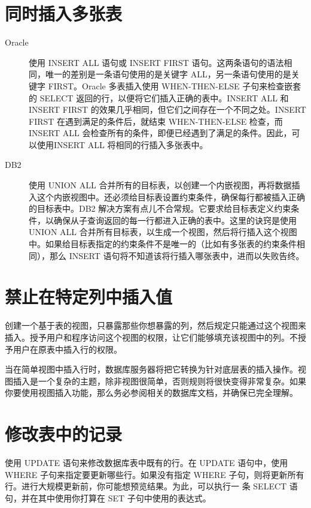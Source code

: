 \section{同时插入多张表}
\begin{description}
    \item[Oracle] 使用 INSERT ALL 语句或 INSERT FIRST 语句。这两条语句的语法相同，唯一的差别是一条语句使用的是关键字 ALL，另一条语句使用的是关键字 FIRST。Oracle 多表插入使用 WHEN-THEN-ELSE 子句来检查嵌套的 SELECT 返回的行，以便将它们插入正确的表中。INSERT ALL 和 INSERT FIRST 的效果几乎相同，但它们之间存在一个不同之处。INSERT FIRST 在遇到满足的条件后，就结束 WHEN-THEN-ELSE 检查，而 INSERT ALL 会检查所有的条件，即便已经遇到了满足的条件。因此，可以使用INSERT ALL 将相同的行插入多张表中。
    \item[DB2] 使用 UNION ALL 合并所有的目标表，以创建一个内嵌视图，再将数据插入这个内嵌视图中。还必须给目标表设置约束条件，确保每行都被插入正确的目标表中。DB2 解决方案有点儿不合常规。它要求给目标表定义约束条件，以确保从子查询返回的每一行都进入正确的表中。这里的诀窍是使用 UNION ALL 合并所有目标表，以生成一个视图，然后将行插入这个视图中。如果给目标表指定的约束条件不是唯一的（比如有多张表的约束条件相同），那么 INSERT 语句将不知道该将行插入哪张表中，进而以失败告终。
\end{description}
\section{禁止在特定列中插入值}
创建一个基于表的视图，只暴露那些你想暴露的列，然后规定只能通过这个视图来插入。授予用户和程序访问这个视图的权限，让它们能够填充该视图中的列。不授予用户在原表中插入行的权限。

当在简单视图中插入行时，数据库服务器将把它转换为针对底层表的插入操作。视图插入是一个复杂的主题，除非视图很简单，否则规则将很快变得非常复杂。如果你要使用视图插入功能，那么务必参阅相关的数据库文档，并确保已完全理解。
\section{修改表中的记录}
使用 UPDATE 语句来修改数据库表中既有的行。在 UPDATE 语句中，使用 WHERE 子句来指定要更新哪些行。如果没有指定 WHERE 子句，则将更新所有行。进行大规模更新前，你可能想预览结果。为此，可以执行一
条 SELECT 语句，并在其中使用你打算在 SET 子句中使用的表达式。
